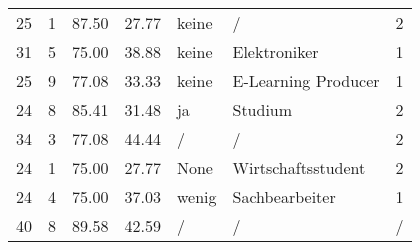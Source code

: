 \begin{longtable}{rrrrllr}
        25    & 1                   & 87.50 & 27.77 & keine     & /                   & 2                                                                                                                                                                                                                                      \\
        31    & 5                   & 75.00 & 38.88 & keine     & Elektroniker        & 1                                                                                                                                                                                                                                      \\
        25    & 9                   & 77.08 & 33.33 & keine     & E-Learning Producer & 1                                                                                                                                                                                                                                      \\
        24    & 8                   & 85.41 & 31.48 & ja        & Studium             & 2                                                                                                                                                                                                                                      \\
        34    & 3                   & 77.08 & 44.44 & /         & /                   & 2                                                                                                                                                                                                                                      \\
        24    & 1                   & 75.00 & 27.77 & None      & Wirtschaftsstudent  & 2                                                                                                                                                                                                                                      \\
        24    & 4                   & 75.00 & 37.03 & wenig     & Sachbearbeiter      & 1                                                                                                                                                                                                                                      \\
        40    & 8                   & 89.58 & 42.59 & /         & /                   & /                                                                                                                                                                                                                                      \\

\end{longtable}
